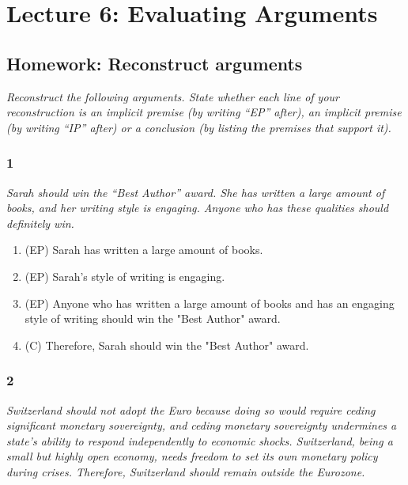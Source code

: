 
\section{Lecture 6: Evaluating Arguments}

\subsection{Homework: Reconstruct arguments}

\textit{Reconstruct the following arguments. State whether each line
of your reconstruction is an implicit premise (by writing “EP” after),
an implicit premise (by writing “IP” after) or a conclusion (by listing the
premises that support it).}

\subsubsection{1}

\textit{Sarah should win the “Best Author” award. She has written a large
amount of books, and her writing style is engaging. Anyone who has these
qualities should definitely win.}

\begin{enumerate}
    \item (EP) Sarah has written a large amount of books.
    \item (EP) Sarah's style of writing is engaging.
    \item (EP) Anyone who has written a large amount of books and
        has an engaging style of writing should win the "Best Author" award.
    \item (C) Therefore, Sarah should win the "Best Author" award.
\end{enumerate}

\subsubsection{2}

\textit{Switzerland should not adopt the Euro because doing so would
require ceding significant monetary sovereignty, and ceding monetary
sovereignty undermines a state’s ability to respond independently
to economic shocks. Switzerland, being a small but highly open economy,
needs freedom to set its own monetary policy during crises. Therefore,
Switzerland should remain outside the Eurozone.}

